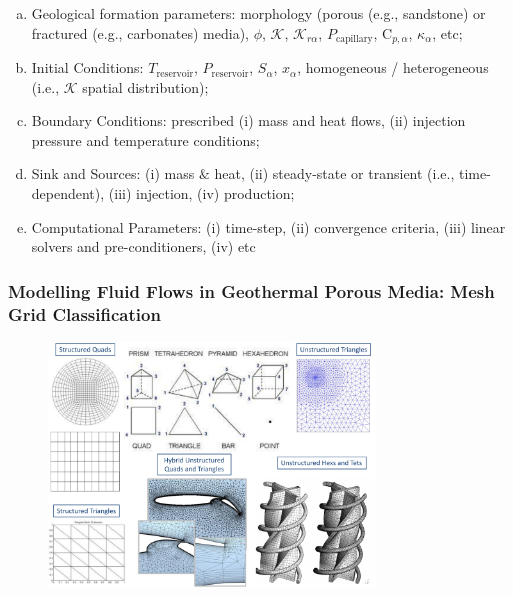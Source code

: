 \documentclass[10pt,compress]{beamer}
\begin{document}
\begin{frame}
\begin{enumerate}[1.]
\begin{enumerate}[(a)]
\begin{enumerate}[{b.}i)]
                       \end{enumerate}
                   \item <7-> Geological formation parameters: morphology (porous (e.g., sandstone) or fractured (e.g., carbonates) media), $\phi$, $\mathcal{K}$, $\mathcal{K}_{r\alpha}$, $P_{\text{capillary}}$, C$_{p,\alpha}$, $\kappa_{\alpha}$, etc;
                   \item <8-> Initial Conditions: $T_{\text{reservoir}}$, $P_{\text{reservoir}}$, $S_{\alpha}$, $x_{\alpha}$, homogeneous / heterogeneous (i.e., $\mathcal{K}$ spatial distribution);
                   \item <9-> Boundary Conditions: prescribed (i) mass and heat flows, (ii) injection pressure and temperature conditions;
                   \item <10-> Sink and Sources: (i) mass $\&$ heat, (ii) steady-state or transient (i.e., time-dependent), (iii) injection, (iv) production;
                   \item <11-> Computational Parameters: (i) time-step, (ii) convergence criteria, (iii) linear solvers and pre-conditioners, (iv) etc
               \end{enumerate}
         \end{enumerate}
\end{frame}


\begin{frame}
 \frametitle{Modelling Fluid Flows in Geothermal Porous Media: Mesh Grid Classification}

   \begin{figure}%
     \includegraphics[width=9.cm, height=6.5cm, clip]{./Pics/MeshGrid_Examples.pdf}\label{xx}
   \end{figure}  

\end{frame}
\end{document}
